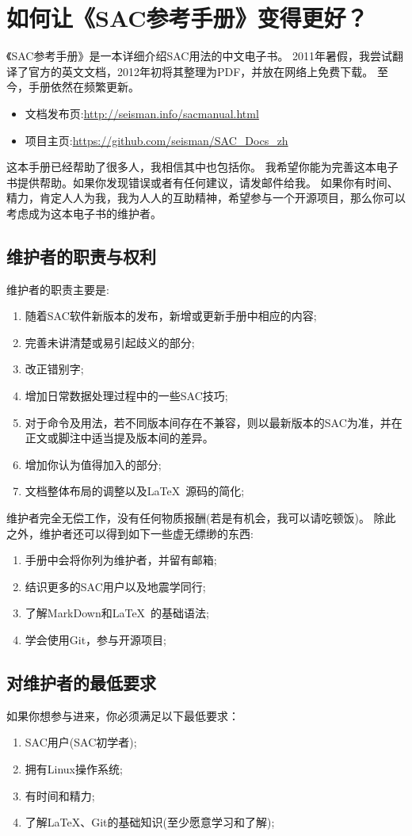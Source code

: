 \section{如何让《SAC参考手册》变得更好？}
《SAC参考手册》是一本详细介绍SAC用法的中文电子书。
2011年暑假，我尝试翻译了官方的英文文档，2012年初将其整理为PDF，并放在网络上免费下载。
至今，手册依然在频繁更新。
\begin{itemize}
\item 文档发布页:\url{http://seisman.info/sac­manual.html}
\item 项目主页:\url{https://github.com/seisman/SAC_Docs_zh }
\end{itemize}

这本手册已经帮助了很多人，我相信其中也包括你。
我希望你能为完善这本电子书提供帮助。如果你发现错误或者有任何建议，请发邮件给我。
如果你有时间、精力，肯定人人为我，我为人人的互助精神，希望参与一个开源项目，那么你可以考虑成为这本电子书的维护者。
\subsection{维护者的职责与权利}
维护者的职责主要是:
\begin{enumerate}
\item 随着SAC软件新版本的发布，新增或更新手册中相应的内容;
\item 完善未讲清楚或易引起歧义的部分;
\item 改正错别字;
\item 增加日常数据处理过程中的一些SAC技巧;
\item 对于命令及用法，若不同版本间存在不兼容，则以最新版本的SAC为准，并在正文或脚注中适当提及版本间的差异。
\item 增加你认为值得加入的部分;
\item 文档整体布局的调整以及\LaTeX~源码的简化;
\end{enumerate}

维护者完全无偿工作，没有任何物质报酬(若是有机会，我可以请吃顿饭)。
除此之外，维护者还可以得到如下一些虚无缥缈的东西:
\begin{enumerate}
\item 手册中会将你列为维护者，并留有邮箱;
\item 结识更多的SAC用户以及地震学同行;
\item 了解MarkDown和\LaTeX~的基础语法;
\item 学会使用Git，参与开源项目;
\end{enumerate}
\subsection{对维护者的最低要求}
如果你想参与进来，你必须满足以下最低要求：
\begin{enumerate}
\item SAC用户(SAC初学者);
\item 拥有Linux操作系统;
\item 有时间和精力;
\item 了解\LaTeX、Git的基础知识(至少愿意学习和了解);
\end{enumerate}
